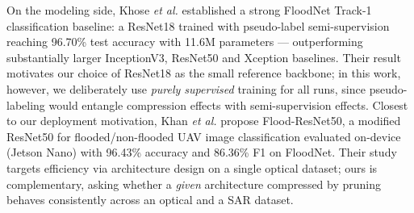 \documentclass[conference]{IEEEtran}
\newif\ifreview
\newcommand{\REV}[1]{\ifreview\textcolor{red}{\textbf{[Revise: #1]}}\fi}
\begin{document}
On the modeling side, Khose \emph{et al.}
\cite{khose2021semisupervised} established a strong FloodNet Track-1
classification baseline: a ResNet18 trained with pseudo-label
semi-supervision \cite{lee2013pseudo} reaching 96.70\% test accuracy
with 11.6M parameters --- outperforming substantially larger
InceptionV3, ResNet50 and Xception baselines. Their result motivates
our choice of ResNet18 as the small reference backbone; in this work,
however, we deliberately use \emph{purely supervised} training for all
runs, since pseudo-labeling would entangle compression effects with
semi-supervision effects. Closest to our deployment motivation, Khan
\emph{et al.} \cite{khan2023floodresnet50} propose Flood-ResNet50, a
modified ResNet50 for flooded/non-flooded UAV image classification
evaluated on-device (Jetson Nano) with 96.43\% accuracy and 86.36\% F1
on FloodNet. Their study targets efficiency via architecture design on
a single optical dataset; ours is complementary, asking whether a
\emph{given} architecture compressed by pruning behaves consistently
across an optical and a SAR dataset.
\REV{[A7] Add a small comparison table (Table~\ref{tab:compare} stub
below) of published FloodNet numbers vs.\ our dense/pruned ResNet18
with a clear caveat: published numbers are on the official hidden test
set, ours on a 199-image split of the training labels, so they are
\emph{not} directly comparable. Also add one sentence on prior
Sentinel-1 flood-classification work (cite 1--2 papers) so the SAR
side is not represented by the dataset paper alone.}
\end{document}
